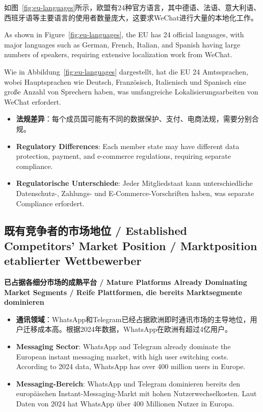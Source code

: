 \documentclass[11pt,a4paper]{article}
\begin{document}
如图~\ref{fig:eu-languages}所示，欧盟有24种官方语言，其中德语、法语、意大利语、西班牙语等主要语言的使用者数量庞大，这要求WeChat进行大量的本地化工作。

As shown in Figure~\ref{fig:eu-languages}, the EU has 24 official languages, with major languages such as German, French, Italian, and Spanish having large numbers of speakers, requiring extensive localization work from WeChat.

Wie in Abbildung~\ref{fig:eu-languages} dargestellt, hat die EU 24 Amtssprachen, wobei Hauptsprachen wie Deutsch, Französisch, Italienisch und Spanisch eine große Anzahl von Sprechern haben, was umfangreiche Lokalisierungsarbeiten von WeChat erfordert.

\begin{itemize}
    
    \item \textbf{法规差异}：每个成员国可能有不同的数据保护、支付、电商法规，需要分别合规。
    \item \textbf{Regulatory Differences}: Each member state may have different data protection, payment, and e-commerce regulations, requiring separate compliance.
    \item \textbf{Regulatorische Unterschiede}: Jeder Mitgliedstaat kann unterschiedliche Datenschutz-, Zahlungs- und E-Commerce-Vorschriften haben, was separate Compliance erfordert.
\end{itemize}

\subsection{既有竞争者的市场地位 / Established Competitors' Market Position / Marktposition etablierter Wettbewerber}

\textbf{已占据各细分市场的成熟平台 / Mature Platforms Already Dominating Market Segments / Reife Plattformen, die bereits Marktsegmente dominieren}

\begin{itemize}
    \item \textbf{通讯领域}：WhatsApp和Telegram已经占据欧洲即时通讯市场的主导地位，用户迁移成本高。根据2024年数据，WhatsApp在欧洲有超过4亿用户。
    \item \textbf{Messaging Sector}: WhatsApp and Telegram already dominate the European instant messaging market, with high user switching costs. According to 2024 data, WhatsApp has over 400 million users in Europe.
    \item \textbf{Messaging-Bereich}: WhatsApp und Telegram dominieren bereits den europäischen Instant-Messaging-Markt mit hohen Nutzerwechselkosten. Laut Daten von 2024 hat WhatsApp über 400 Millionen Nutzer in Europa.
\end{itemize}
\end{document}
